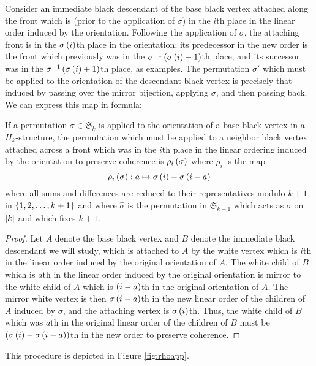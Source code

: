 \documentclass[sectionflow,singlespace,twoside,boldmathhdr]{brandiss} %
\numberwithin{section}{chapter}
\numberwithin{figure}{chapter}
\begin{document}
Consider an immediate black descendant of the base black vertex attached along the front which is (prior to the application of $\sigma$) in the $i$th place in the linear order induced by the orientation. Following the application of $\sigma$, the attaching front is in the $\sigma \left( {i} \right)$th place in the orientation; its predecessor in the new order is the front which previously was in the $\sigma^{-1} \left( {\sigma \left( {i} \right) - 1} \right)$th place, and its successor was in the $\sigma^{-1} \left( {\sigma \left( {i} \right) + 1} \right)$th place, as examples.
The permutation $\sigma'$ which must be applied to the orientation of the descendant black vertex is precisely that induced by passing over the mirror bijection, applying $\sigma$, and then passing back.
We can express this map in formula:
\begin{theorem}
  \label{thm:rhodef}
  If a permutation $\sigma \in \mathfrak{S}_{k}$ is applied to the orientation of a base black vertex in a $H_{k}$-structure, the permutation which must be applied to a neighbor black vertex attached across a front which was in the $i$th place in the linear ordering induced by the orientation to preserve coherence is $\rho_{i} \left( {\sigma} \right)$ where $\rho_{i}$ is the map
  \begin{equation}
    \label{eq:rhodef}
    \rho_{i} \left( {\sigma} \right): a \mapsto \sigma \left( {i} \right) - \sigma \left( {i - a} \right)
  \end{equation}
  where all sums and differences are reduced to their representatives modulo $k+1$ in $\left\{ {1, 2, \dots, k+1} \right\}$ and where $\hat{\sigma}$ is the permutation in $\mathfrak{S}_{k+1}$ which acts as $\sigma$ on $\left[ {k} \right]$ and which fixes $k+1$.
\end{theorem}
\begin{proof}
  Let $A$ denote the base black vertex and $B$ denote the immediate black descendant we will study, which is attached to $A$ by the white vertex which is $i$th in the linear order induced by the original orientation of $A$.
  The white child of $B$ which is $a$th in the linear order induced by the original orientation is mirror to the white child of $A$ which is $\left( {i-a} \right)$th in the original orientation of $A$.
  The mirror white vertex is then $\sigma \left( {i - a} \right)$th in the new linear order of the children of $A$ induced by $\sigma$, and the attaching vertex is $\sigma \left( {i} \right)$th.
  Thus, the white child of $B$ which was $a$th in the original linear order of the children of $B$ must be $\left( {\sigma \left( {i} \right) - \sigma \left( {i-a} \right)} \right)$th in the new order to preserve coherence.
\end{proof}
This procedure is depicted in Figure \ref{fig:rhoapp}.
\end{document}
